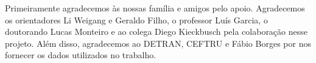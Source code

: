 Primeiramente agradecemos às nossas família e amigos pelo apoio. Agradecemos os orientadores Li Weigang e Geraldo Filho, o professor Luís Garcia, o doutorando Lucas Monteiro e ao colega Diego Kieckbusch pela colaboração nesse projeto. Além disso, agradecemos ao DETRAN, CEFTRU e Fábio Borges por nos fornecer os dados utilizados no trabalho.
